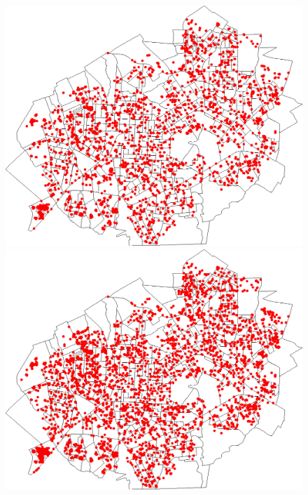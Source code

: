 \begin{figure}[H]
\begin{minipage}{.5\textwidth}
    \captionsetup{labelformat=empty}
  \end{minipage}
  \begin{minipage}{.5\textwidth}
    \centering
    \includegraphics[width=1.0\textwidth]{Figuras/Resultados/0003/Saidas/MonteCarlo_0/Simulacao_0/Acumulado/00080.png}
    \captionsetup{labelformat=empty}
  \end{minipage}%
  \centering
  \begin{minipage}{.5\textwidth}
    \centering
    \includegraphics[width=1.0\textwidth]{Figuras/Resultados/0003/Saidas/MonteCarlo_0/Simulacao_0/Acumulado/00120.png}

\end{minipage}
\end{figure}
